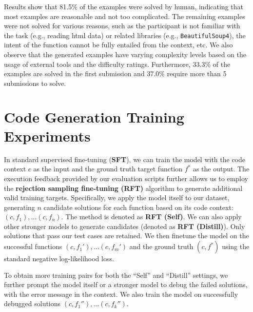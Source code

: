 Results show that 81.5\% of the examples were solved by human, indicating that most examples are reasonable and not too complicated.
The remaining examples were not solved for various reasons, such as the participant is not familiar with the task (e.g., reading html data) or related libraries (e.g., \texttt{BeautifulSoup4}), the intent of the function cannot be fully entailed from the context, etc.
We also observe that the generated examples have varying complexity levels based on the usage of external tools and the difficulty ratings.
Furthermore, 33.3\% of the examples
are solved in the first submission and 37.0\% require more than 5 submissions to solve. 




\section{Code Generation Training Experiments}
\label{sec:code_gen_exps}
In standard supervised fine-tuning (\textbf{SFT}), we can train the model with the code context $c$ as the input and the ground truth target function $f^*$ as the output.
The execution feedback provided by our \repostmethodName evaluation scripts further allows us to employ the \textbf{rejection sampling fine-tuning (RFT)} algorithm to generate additional valid training targets.
Specifically, we apply the model itself to our dataset, generating $n$ candidate solutions for each function based on its code context: $(c, f_1), \ldots (c, f_n)$. The method is denoted as \textbf{RFT (Self)}.
We can also apply other stronger models to generate candidates (denoted as \textbf{RFT (Distill)}). 
Only solutions that pass our test cases are retained.
We then finetune the model on the successful functions $(c, f_1'), \ldots (c, f_m')$ and the ground truth $(c, f^*)$ using the standard negative log-likelihood loss.

To obtain more training pairs for both the ``Self'' and ``Distill'' settings, we further prompt the model itself or a stronger model to debug the failed solutions, with the error message in the context.
We also train the model on successfully debugged solutions $(c, f_1''), \ldots (c, f_k'')$.





